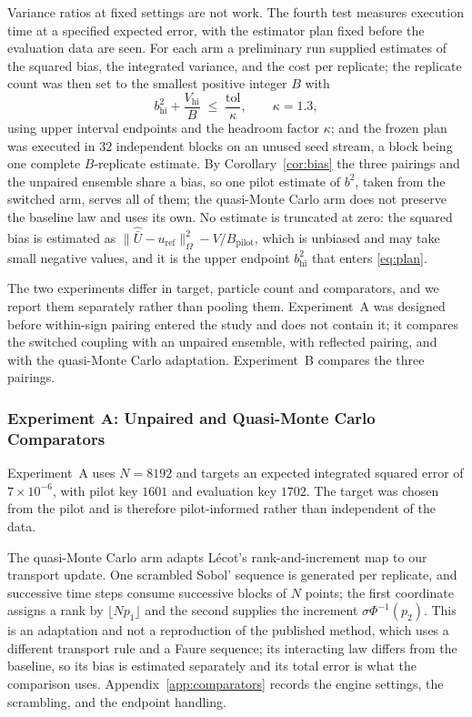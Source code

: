 \documentclass[smallextended,nospthms]{svjour3}
\theoremstyle{plain}
\theoremstyle{definition}
\theoremstyle{remark}
\numberwithin{equation}{section}
\begin{document}
Variance ratios at fixed settings are not work. The fourth test measures
execution time at a specified expected error, with the estimator plan fixed
before the evaluation data are seen. For each arm a preliminary run supplied
estimates of the squared bias, the integrated variance, and the cost per
replicate; the replicate count was then set to the smallest positive integer
$B$ with
\begin{equation}
 b^2_{\mathrm{hi}}+\frac{V_{\mathrm{hi}}}{B}\;\le\;\frac{\mathrm{tol}}{\kappa},
 \qquad \kappa=1.3,
 \label{eq:plan}
\end{equation}
using upper interval endpoints and the headroom factor $\kappa$; and the frozen
plan was executed in $32$ independent blocks on an unused seed stream, a block
being one complete $B$-replicate estimate. By Corollary~\ref{cor:bias} the
three pairings and the unpaired ensemble share a bias, so one pilot estimate of
$b^2$, taken from the switched arm, serves all of them; the quasi-Monte Carlo
arm does not preserve the baseline law and uses its own. No estimate is
truncated at zero: the squared bias is estimated as
$\|\hat{\bar U}-u_{\mathrm{ref}}\|^2_\Omega-V/B_{\mathrm{pilot}}$, which is
unbiased and may take small negative values, and it is the upper endpoint
$b^2_{\mathrm{hi}}$ that enters \eqref{eq:plan}.

The two experiments differ in target, particle count and comparators, and we
report them separately rather than pooling them. Experiment~A was designed
before within-sign pairing entered the study and does not contain it; it
compares the switched coupling with an unpaired ensemble, with reflected
pairing, and with the quasi-Monte Carlo adaptation. Experiment~B compares the
three pairings.

\subsubsection{Experiment A: Unpaired and Quasi-Monte Carlo Comparators}
\label{sec:heldoutA}

Experiment~A uses $N=8192$ and targets an expected integrated squared error of
$7\times10^{-6}$, with pilot key $1601$ and evaluation key $1702$. The target
was chosen from the pilot and is therefore pilot-informed rather than
independent of the data.

The quasi-Monte Carlo arm adapts Lécot's rank-and-increment map
\citep[Eq. (45)]{lecot_rims2001} to our transport update. One scrambled Sobol'
sequence is generated per replicate, and successive time steps consume
successive blocks of $N$ points; the first coordinate assigns a rank by
$\lfloor Np_1\rfloor$ and the second supplies the increment
$\sigma\Phi^{-1}(p_2)$. This is an adaptation and not a reproduction of the
published method, which uses a different transport rule and a Faure sequence;
its interacting law differs from the baseline, so its bias is estimated
separately and its total error is what the comparison uses.
Appendix~\ref{app:comparators} records the engine settings, the scrambling, and
the endpoint handling.
\end{document}
